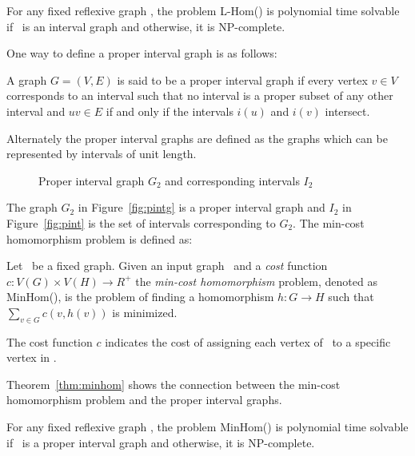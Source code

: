 \begin{theorem}  \label{thm:lhom}
For any fixed reflexive graph \mH, the problem L-Hom(\mH) is polynomial time solvable if
\mH\ is an interval graph and otherwise, it is NP-complete.
\end{theorem}

One way to define a proper interval graph is as follows:

\begin{defi}
A graph \(G=(V,E)\) is said to be a proper interval graph if every vertex \(v \in V\)
corresponds to an interval such that no interval is a proper subset of any other interval
and \(uv \in E\) if and only if the intervals \(i(u)\) and \(i(v)\) intersect.
\end{defi}

Alternately the proper interval graphs are defined as the graphs which can be represented 
by intervals of unit length.

\begin{figure}[h]
\hfill
\subfigure[\ensuremath{G_2}]{\label{fig:pintg}}\hfill 
\subfigure[\ensuremath{I_2}]{\label{fig:pint}}\hfill 
\caption{Proper interval graph \ensuremath{G_2} and corresponding intervals
\ensuremath{I_2}}\label{fig:pintgi}
\end{figure}

The graph \(G_2\) in Figure~\ref{fig:pintg} is a proper interval graph and
\(I_2\) in Figure~\ref{fig:pint} is the set of intervals corresponding to \(G_2\)\@.
The min-cost homomorphism problem is defined as:

\begin{defi} [MinHom]
Let \mH\ be a fixed graph. Given an input graph \mG\ and a \emph{cost} function
\(c: V(G) \times V(H) \to R^+\) the \emph{min-cost homomorphism} problem,
denoted as MinHom(\mH), is the problem of finding a homomorphism 
\(h:G\to H\) such that \(\sum_{v\in G} c(v, h(v))\) is minimized.
\end{defi}

The cost function \(c\) indicates the cost of assigning each vertex of \mG\ 
to a specific vertex in \mH\@. 

Theorem~\ref{thm:minhom} shows the connection between the min-cost homomorphism problem 
and the proper interval graphs.

\begin{theorem} [TODO] \label{thm:minhom}
For any fixed reflexive graph \mH, the problem MinHom(\mH) is polynomial time solvable if
\mH\ is a proper interval graph and otherwise, it is NP-complete.
\end{theorem}

